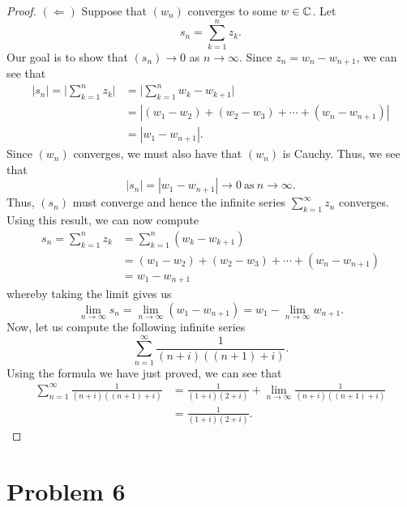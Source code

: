 \documentclass[a4paper]{article}
\begin{document}
\begin{proof}
\( (\Leftarrow) \) Suppose that \( ({w}_{n}) \) converges to some \( w \in \mathbb{C}  \). Let
\[  {s}_{n} = \sum_{ k=1  }^{ n } {z}_{k}. \]
Our goal is to show that \( ({s}_{n}) \to 0  \) as \( n \to \infty  \). Since \( {z}_{n} = {w}_{n} - {w}_{n+1} \), we can see that      
\begin{align*}
    | {s}_{n} | = \Big| \sum_{ k=1  }^{ n } {z}_{k}  \Big| &= \Big| \sum_{ k=1  }^{ n } {w}_{k} - {w}_{k+1} \Big|   \\
                &= | ({w}_{1} - {w}_{2}) + ({w}_{2} - {w}_{3}) + \cdots + ({w}_{n} - {w}_{n+1}) | \\
                &= | {w}_{1} - {w}_{n+1} |.
\end{align*}
Since \( ({w}_{n})  \) converges, we must also have that \( ({w}_{n}) \) is Cauchy. Thus, we see that 
\[  | {s}_{n} | = | {w}_{1} - {w}_{n+1}  |  \to 0 \ \text{as} \ n  \to \infty.   \]
Thus, \( ({s}_{n}) \) must converge and hence the infinite series \( \sum_{ k=1  }^{ \infty  } {z}_{n}  \) converges. Using this result, we can now compute
\begin{align*}
    {s}_{n} = \sum_{ k=1  }^{ n } {z}_{k} &= \sum_{ k=1  }^{ n } ({w}_{k} - {w}_{k+1})  \\
                                          &=  ({w}_{1} - {w}_{2}) + ({w}_{2} - {w}_{3}) + \cdots + ({w}_{n} - {w}_{n+1}) \\
                                          &= {w}_{1} - {w}_{n+1}
\end{align*}
whereby taking the limit gives us
\[  \lim_{ n \to \infty  }  {s}_{n} = \lim_{ n \to \infty  }  ({w}_{1} - {w}_{n+1}) = {w}_{1} - \lim_{ n \to \infty  }  {w}_{n+1}. \]
Now, let us compute the following infinite series
\[  \sum_{ n=1  }^{  \infty  } \frac{ 1 }{ (n+i)((n+1)+i) }.  \]
Using the formula we have just proved, we can see that
\begin{align*}
\sum_{ n=1 }^{ \infty  } \frac{ 1  }{  (n+i)((n+1)+i) }  &= \frac{ 1 }{ (1+i) (2 + i) }  + \lim_{ n \to \infty  }  \frac{ 1 }{ (n+i)((n+1) + i) }   \\
                                                         &= \frac{ 1 }{ (1+i) (2+i) }.
\end{align*}
\end{proof}

\section*{Problem 6}
\end{document}
